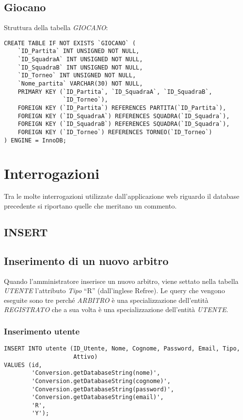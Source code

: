 \newpage

\subsection{Giocano}
Struttura della tabella \emph{GIOCANO}:

\begin{lstlisting}
CREATE TABLE IF NOT EXISTS `GIOCANO` (
	`ID_Partita` INT UNSIGNED NOT NULL,
	`ID_SquadraA` INT UNSIGNED NOT NULL,
	`ID_SquadraB` INT UNSIGNED NOT NULL,
	`ID_Torneo` INT UNSIGNED NOT NULL,
	`Nome_partita` VARCHAR(30) NOT NULL,
	PRIMARY KEY (`ID_Partita`, `ID_SquadraA`, `ID_SquadraB`,
	             `ID_Torneo`),
	FOREIGN KEY (`ID_Partita`) REFERENCES PARTITA(`ID_Partita`),
	FOREIGN KEY (`ID_SquadraA`) REFERENCES SQUADRA(`ID_Squadra`),
	FOREIGN KEY (`ID_SquadraB`) REFERENCES SQUADRA(`ID_Squadra`),
	FOREIGN KEY (`ID_Torneo`) REFERENCES TORNEO(`ID_Torneo`)
) ENGINE = InnoDB;
\end{lstlisting}

\section{Interrogazioni}
Tra le molte interrogazioni utilizzate dall'applicazione web riguardo il database precedente si riportano quelle che meritano un commento.

\subsection{INSERT}

\subsection*{Inserimento di un nuovo arbitro}
Quando l'amministratore inserisce un nuovo arbitro, viene settato nella tabella \emph{UTENTE} l'attributo \emph{Tipo} ``R'' (dall'inglese Refree). Le query che vengono eseguite sono tre perché \emph{ARBITRO} è una specializzazione dell'entità \emph{REGISTRATO} che a sua volta è una specializzazione dell'entità \emph{UTENTE}.

\subsubsection*{Inserimento utente}

\begin{lstlisting}
INSERT INTO utente (ID_Utente, Nome, Cognome, Password, Email, Tipo,
                    Attivo)
VALUES (id,
        'Conversion.getDatabaseString(nome)',
        'Conversion.getDatabaseString(cognome)',
        'Conversion.getDatabaseString(password)',
        'Conversion.getDatabaseString(email)',
        'R',
        'Y');
\end{lstlisting}

